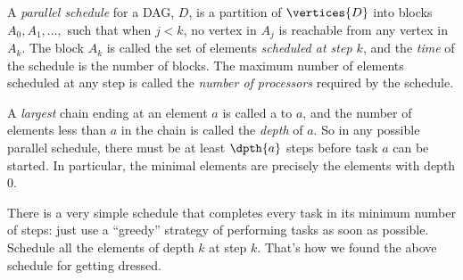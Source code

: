 \begin{definition}\label{def:schedule}
A \emph{parallel schedule} for a DAG, $D$, is a partition of
$\vertices{D}$ into blocks $A_0, A_1,\dots,$ such that when $j < k$,
no vertex in $A_j$ is reachable from any vertex in $A_k$.  The block
$A_k$ is called the set of elements \emph{scheduled at step $k$}, and
the \emph{time} of the schedule is the number of blocks.  The
maximum number of elements scheduled at any step is called the
\emph{number of processors} required by the schedule.
\end{definition}

\iffalse

So the schedule we chose above for clothes has four steps
\begin{align*}
A_0 = & \set{\text{leftsock, rightsock, underwear, shirt}},\\
A_1 = & \set{\text{pants, sweater}},\\
A_2 = & \set{\text{leftshoe, rightshoe, belt}},\\
A_3 = & \set{\text{jacket}}.
\end{align*}
and requires four processors (to complete the first step).

Notice that the dependencies constrain the tasks underwear, pants,
belt, and jacket to be done in sequence.  This implies
that at least four steps are needed in \emph{every} schedule for
getting dressed, since if we used fewer than four steps, two of these
tasks would have to be scheduled at the same time.  A set of tasks
that must be done in sequence like this is called a \emph{chain}.

\begin{definition}
A \term{chain} a set of vertices in a DAG such that any two different
vertices in the set are comparable, meaning there is a walk from one
to the other\footnote{We'll define this term with slightly more
  technical vocabulary in Def.~\ref{def:path_total}, but the concept
  is fairly intuitive}.  A chain is said to \emph{end at} its maximum element.
\end{definition}
\fi

A \emph{largest} chain ending at an element $a$ is called a
 to $a$, and the number of elements less than $a$
in the chain is called the \emph{depth} of $a$.  So in any possible
parallel schedule, there must be at least $\dpth{a}$ steps before task
$a$ can be started.  In particular, the minimal elements are precisely
the elements with depth 0.

There is a very simple schedule that completes every task in its
minimum number of steps: just use a ``greedy'' strategy of performing
tasks as soon as possible.  Schedule all the elements of depth
$k$ at step $k$.  That's how we found the above schedule for getting dressed.

